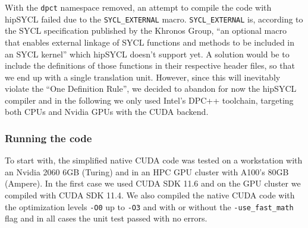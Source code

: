 \documentclass[../main]{subfiles}
\begin{document}
With the \texttt{dpct} namespace removed, an attempt to compile the code with hipSYCL failed due to the \texttt{SYCL\_EXTERNAL} macro.
\texttt{SYCL\_EXTERNAL} is, according to the SYCL specification published by the Khronos Group, ``an optional macro that enables external linkage of SYCL functions and methods to be included in an SYCL kernel'' which hipSYCL doesn't support yet.
A solution would be to include the definitions of those functions in their respective header files, so that we end up with a single translation unit.
However, since this will inevitably violate the ``One Definition Rule'', we decided to abandon for now the hipSYCL compiler and in the following we only used Intel's DPC++ toolchain, targeting both CPUs and Nvidia GPUs with the CUDA backend.

\subsubsection{Running the code}\label{sec:dgpoly3d_running}
To start with, the simplified native CUDA code was tested on a workstation with an Nvidia 2060 6GB (Turing) and in an HPC GPU cluster with A100's 80GB (Ampere).
In the first case we used CUDA SDK 11.6 and on the GPU cluster we compiled with CUDA SDK 11.4.
We also compiled the native CUDA code with the optimization levels \texttt{-O0} up to \texttt{-O3} and with or without the \texttt{-use\_fast\_math} flag and in all cases the unit test passed with no errors.
\end{document}
